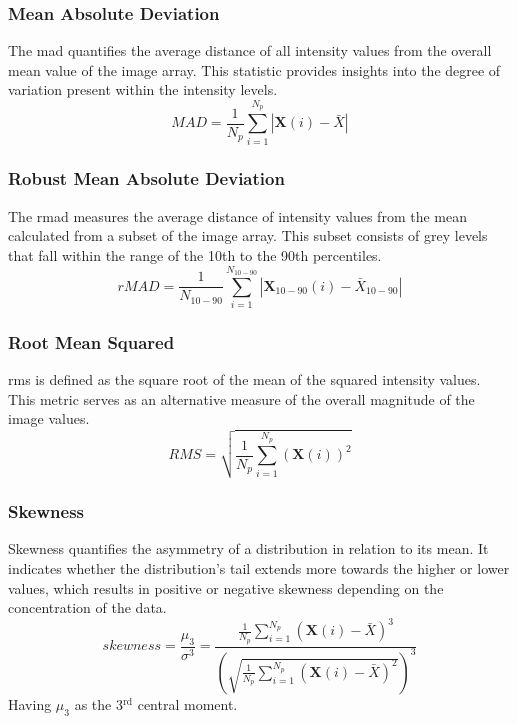 \subsubsection*{Mean Absolute Deviation}
The \acf{mad} quantifies the average distance of all intensity values from the overall mean value of the image array. This statistic provides insights into the degree of variation present within the intensity levels.
\begin{equation}
    \textit{MAD} = \frac{1}{N_p}\displaystyle\sum^{N_p}_{i=1}{|\textbf{X}(i)-\bar{X}|}
\end{equation}

\subsubsection*{Robust Mean Absolute Deviation}
The \acf{rmad} measures the average distance of intensity values from the mean calculated from a subset of the image array. This subset consists of grey levels that fall within the range of the 10th to the 90th percentiles.
\begin{equation}
\textit{rMAD} = \frac{1}{N_{10-90}}\displaystyle\sum^{N_{10-90}}_{i=1}
      {|\textbf{X}_{10-90}(i)-\bar{X}_{10-90}|}
\end{equation}

\subsubsection*{Root Mean Squared}
\acf{rms} is defined as the square root of the mean of the squared intensity values. This metric serves as an alternative measure of the overall magnitude of the image values.
\begin{equation}
    \textit{RMS} = \sqrt{\frac{1}{N_p}\sum^{N_p}_{i=1}{(\textbf{X}(i))^2}}
\end{equation}

%
\subsubsection*{Skewness}
Skewness quantifies the asymmetry of a distribution in relation to its mean. It indicates whether the distribution's tail extends more towards the higher or lower values, which results in positive or negative skewness depending on the concentration of the data.
\begin{equation}
    \textit{skewness} = \displaystyle\frac{\mu_3}{\sigma^3} =
        \frac{\frac{1}{N_p}\sum^{N_p}_{i=1}{(\textbf{X}(i)-\bar{X})^3}}
        {\left(\sqrt{\frac{1}{N_p}\sum^{N_p}_{i=1}{(\textbf{X}(i)-\bar{X})^2}}\right)^3}
\end{equation}
Having $\mu_3$ as the 3$^{\text{rd}}$ central moment.

